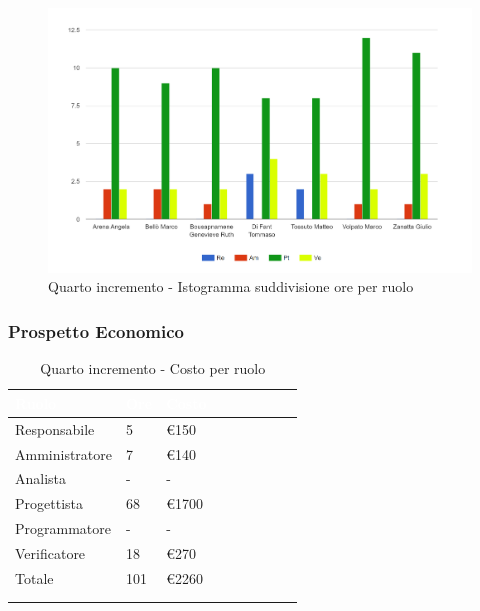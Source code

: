 {{      \begin{figure}[H]
        \includegraphics[width=15cm]{sezioni/images/quarto.png}
        \centering
        \caption{Quarto incremento - Istogramma suddivisione ore per ruolo}
     \end{figure}
    }

    \subsubsection{Prospetto Economico}
    {
        \setlength{\freewidth}{\dimexpr\textwidth-30\tabcolsep}
        \renewcommand{\arraystretch}{1.0}
        \setlength{\aboverulesep}{0pt}
        \setlength{\belowrulesep}{0pt}
        \begin{longtable}{C{.4\freewidth} C{.2\freewidth} C{.2\freewidth} C{.2\freewidth} C{.2\freewidth} C{.2\freewidth} C{.2\freewidth} C{.2\freewidth} C{.2\freewidth}}
          \toprule
        \textcolor{white}{\textbf{Ruolo}}&
        \textcolor{white}{\textbf{Ore}}&
        \textcolor{white}{\textbf{Costo}}\\
        \toprule
        \endhead
            
        Responsabile  & 5 & \euro150\\
        Amministratore  & 7& \euro140 \\
        Analista &- & -\\
        Progettista &68 &\euro1700\\
        Programmatore &- & -\\
        Verificatore &18 &\euro270\\
        Totale&101&\euro2260\\
        \bottomrule
      \\
        \caption{Quarto incremento - Costo per ruolo}


\end{longtable}}}
